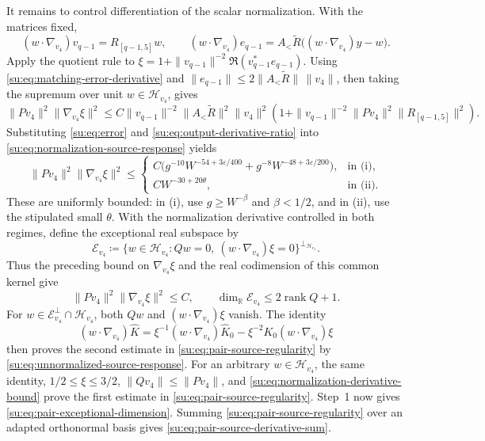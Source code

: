 \documentclass[11pt]{article}
\numberwithin{equation}{section}
\theoremstyle{remark}
\newcommand{\R}{\mathbb R}
\newcommand{\rank}{\operatorname{rank}}
\begin{document}
It remains to control differentiation of the scalar normalization.
With the matrices fixed,
\[
 (w\cdot\nabla_{v_4})v_{q-1}=R_{[q-1,5]}w,\qquad
 (w\cdot\nabla_{v_4})e_{q-1}=A_<\widetilde R\bigl((w\cdot\nabla_{v_4})y-w\bigr).
\]
Apply the quotient rule to
$\xi=1+\|v_{q-1}\|^{-2}\Re(v_{q-1}^*e_{q-1})$.
Using \eqref{su:eq:matching-error-derivative} and
$\|e_{q-1}\|\le2\|A_<\widetilde R\|\,\|v_4\|$, then taking the supremum
over unit $w\in\mathcal H_{v_4}$, gives
\begin{equation}\label{su:eq:normalization-source-response}
 \|Pv_4\|^2\|\nabla_{v_4}\xi\|^2
 \le C\|v_{q-1}\|^{-2} \|A_<\widetilde R\|^2\|v_4\|^2\left(1+
       \|v_{q-1}\|^{-2} \|Pv_4\|^2\|R_{[q-1,5]}\|^2\right).
\end{equation}
Substituting \eqref{su:eq:error} and
\eqref{su:eq:output-derivative-ratio} into
\eqref{su:eq:normalization-source-response} yields
\begin{equation}\label{su:eq:normalization-derivative-bound}
 \|Pv_4\|^2\|\nabla_{v_4}\xi\|^2\le
 \begin{cases}
 C\bigl(g^{-10}W^{-54+3\varepsilon/400}+g^{-8}W^{-48+3\varepsilon/200}\bigr),
     &\text{in (i)},\\
 CW^{-30+20\theta},&\text{in (ii)}.
 \end{cases}
\end{equation}
These are uniformly bounded: in (i), use $g\ge W^{-\beta}$ and
$\beta<1/2$, and in (ii), use the stipulated small $\theta$.
With the normalization derivative controlled in both regimes, define
the exceptional real subspace by
\[
 \mathcal E_{v_4}\coloneqq
 \bigl\{w\in\mathcal H_{v_4}:Qw=0,\ (w\cdot\nabla_{v_4})\xi=0\bigr\}^{\perp_{\mathcal H_{v_4}}}.
\]
Thus the preceding bound on $\nabla_{v_4}\xi$ and the real codimension
of this common kernel give
\begin{equation}\label{su:eq:construction-derivative-goals}
 \|Pv_4\|^2\|\nabla_{v_4}\xi\|^2\le C,\qquad
 \dim_{\R}\mathcal E_{v_4}\le2\rank Q+1.
\end{equation}
For $w\in\mathcal E_{v_4}^\perp\cap\mathcal H_{v_4}$, both $Qw$ and
$(w\cdot\nabla_{v_4})\xi$ vanish. The identity
\[
 (w\cdot\nabla_{v_4})\widehat K
 =\xi^{-1} (w\cdot\nabla_{v_4})\widehat K_0
      -\xi^{-2} K_0(w\cdot\nabla_{v_4})\xi
\]
then proves the second estimate in \eqref{su:eq:pair-source-regularity}
by \eqref{su:eq:unnormalized-source-response}.
For an arbitrary $w\in\mathcal H_{v_4}$, the same identity,
$1/2\le \xi\le3/2$, $\|Qv_4\|\le\|Pv_4\|$, and
\eqref{su:eq:normalization-derivative-bound} prove the first estimate in
\eqref{su:eq:pair-source-regularity}.
Step~1 now gives \eqref{su:eq:pair-exceptional-dimension}. Summing
\eqref{su:eq:pair-source-regularity} over an adapted orthonormal basis
gives \eqref{su:eq:pair-source-derivative-sum}.
\end{document}
